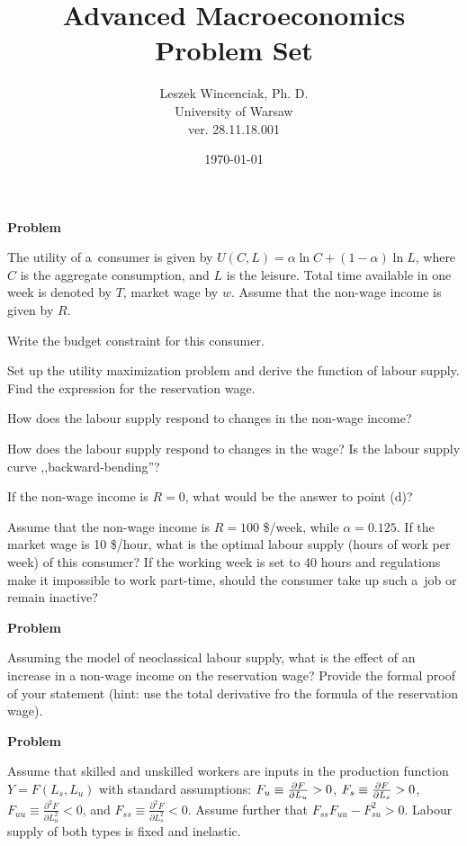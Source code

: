 \documentclass[a4paper, notitlepage, 11pt]{article}
\title{Advanced Macroeconomics Problem Set}
\author{Leszek Wincenciak, Ph. D.\\ University of Warsaw\\ ver. 28.11.18.001}
\date{\today}
\newcounter{zadlicz}[section]%
\newcommand{\tytul}[2]{\setcounter{equation}{0}\addtocounter{zadlicz}{1}\vspace{\abovedisplayskip}\noindent\textbf{#1\ \thezadlicz #2}}%
\newcommand{\Deriv}[2]{\ensuremath\frac{\partial #1}{\partial #2}\ensuremath}%
\begin{document}
\maketitle

\tytul{Problem}{}

\noindent%
The utility of a~consumer is given by $U(C,L)=\alpha\ln C + (1-\alpha)\ln L$, where $C$ is the aggregate consumption, and $L$ is the leisure. Total time available in one week is denoted by $T$, market wage by $w$. Assume that the non-wage income is given by $R$.

\begin{wylicz}
\item Write the budget constraint for this consumer.
\item Set up the utility maximization problem and derive the function of labour supply. Find the expression for the reservation wage.
\item How does the labour supply respond to changes in the non-wage income?
\item How does the labour supply respond to changes in the wage? Is the labour supply curve ,,backward-bending''?
\item If the non-wage income is $R=0$, what would be the answer to point (d)?
\end{wylicz}

Assume that the non-wage income is $R=100$ \$/week, while $\alpha=0.125$. If the market wage is 10 \$/hour, what is the optimal labour supply (hours of work per week) of this consumer? If the working week is set to 40 hours and regulations make it impossible to work part-time, should the consumer take up such a~job or remain inactive?

\tytul{Problem}{}

\noindent%
Assuming the model of neoclassical labour supply, what is the effect of an increase in a non-wage income on the reservation wage? Provide the formal proof of your statement (hint: use the total derivative fro the formula of the reservation wage).

\tytul{Problem}{}

\noindent%
Assume that skilled and unskilled workers are inputs in the production function $Y = F(L_s,L_u)$ with standard assumptions: $F_u\equiv \Deriv{F}{L_u}>0$, $F_s\equiv\Deriv{F}{L_s}>0$,
$F_{uu}\equiv\frac{\partial^2F}{\partial L_u^2}<0$, and
$F_{ss}\equiv\frac{\partial^2F}{\partial L_s^2}<0$. Assume further that $F_{ss}F_{uu}-F^2_{su}>0$. Labour supply of both types is fixed and inelastic.
\end{document}
